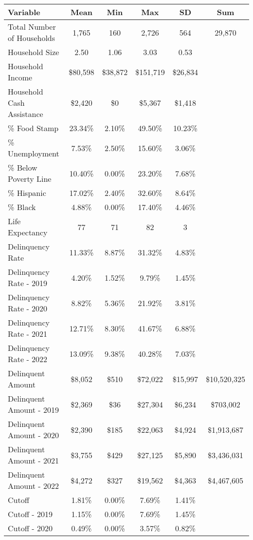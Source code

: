 \begin{tabular}{l|c|c|c|c|c}
\toprule 
\midrule 
Variable & Mean & Min & Max & SD & Sum \\
\midrule 
Total Number of Households & 1,765 & 160 & 2,726 & 564 & 29,870 \\
\quad Household Size & 2.50 & 1.06 & 3.03 & 0.53 \\
Household Income & \$80,598 & \$38,872 & \$151,719 & \$26,834 \\
\quad Household Cash Assistance & \$2,420 & \$0 & \$5,367 & \$1,418 \\
\% Food Stamp & 23.34\% & 2.10\% & 49.50\% & 10.23\% \\
\% Unemployment & 7.53\% & 2.50\% & 15.60\% & 3.06\% \\
\% Below Poverty Line & 10.40\% & 0.00\% & 23.20\% & 7.68\% \\
\% Hispanic & 17.02\% & 2.40\% & 32.60\% & 8.64\% \\
\% Black & 4.88\% & 0.00\% & 17.40\% & 4.46\% \\
Life Expectancy & 77 & 71 & 82 & 3 \\
\midrule 
Delinquency Rate & 11.33\% & 8.87\% & 31.32\% & 4.83\% \\
\quad Delinquency Rate - 2019 & 4.20\% & 1.52\% & 9.79\% & 1.45\% \\
\quad Delinquency Rate - 2020 & 8.82\% & 5.36\% & 21.92\% & 3.81\% \\
\quad Delinquency Rate - 2021 & 12.71\% & 8.30\% & 41.67\% & 6.88\% \\
\quad Delinquency Rate - 2022 & 13.09\% & 9.38\% & 40.28\% & 7.03\% \\
\midrule 
Delinquent Amount & \$8,052 & \$510 & \$72,022 & \$15,997 & \$10,520,325 \\
\quad Delinquent Amount - 2019 & \$2,369 & \$36 & \$27,304 & \$6,234 & \$703,002 \\
\quad Delinquent Amount - 2020 & \$2,390 & \$185 & \$22,063 & \$4,924 & \$1,913,687 \\
\quad Delinquent Amount - 2021 & \$3,755 & \$429 & \$27,125 & \$5,890 & \$3,436,031 \\
\quad Delinquent Amount - 2022 & \$4,272 & \$327 & \$19,562 & \$4,363 & \$4,467,605 \\
\midrule 
Cutoff & 1.81\% & 0.00\% & 7.69\% & 1.41\% \\
\quad Cutoff - 2019 & 1.15\% & 0.00\% & 7.69\% & 1.45\% \\
\quad Cutoff - 2020 & 0.49\% & 0.00\% & 3.57\% & 0.82\% \\

\end{tabular}
